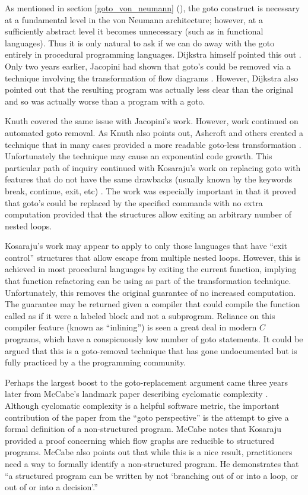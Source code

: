 \documentclass[letterpaper,10pt,twocolumn]{article}
\newcommand{\fullref}[1]{section \ref{#1} (\emph{\nameref{#1}})}
\begin{document}
As mentioned in \fullref{goto_von_neumann}, the goto construct is necessary at a
fundamental level in the von Neumann architecture; however, at a sufficiently
abstract level it becomes unnecessary (such as in functional languages).
Thus it is only natural to ask if we can do away with the goto entirely in
procedural programming languages.  Dijkstra himself pointed this
out \cite{dijkstra}.  Only two years earlier, Jacopini had shown that goto's
could be removed via a technique involving the transformation of flow
diagrams \cite{jacopini}.  However, Dijkstra also pointed out that the resulting
program was actually less clear than the original and so was actually worse
than a program with a goto.

Knuth covered the same issue with Jacopini's work.  However, work continued on
automated goto removal.  As Knuth also points out, Ashcroft and others created
a technique that in many cases provided a more readable goto-less transformation
\cite{ashcroft}. Unfortunately the technique may cause an exponential code growth.
This particular path of inquiry continued with Kosaraju's work on replacing
goto with features that do not have the same drawbacks (usually known by
the keywords break, continue, exit, etc) \cite{kosaraju}.
The work was especially important in that it proved that goto's
could be replaced by the specified commands with no extra computation provided
that the structures allow exiting an arbitrary number of nested loops.

Kosaraju's work may appear to apply to only those languages that have ``exit
control'' structures that allow escape from multiple nested loops.
However, this is achieved in most procedural languages by exiting the
current function, implying that function
refactoring can be using as part of the transformation technique.
Unfortunately, this removes the original guarantee of no increased computation.
The guarantee may be returned given a compiler that could compile the function called
as if it were a labeled block and not a subprogram.  Reliance on this compiler
feature (known as ``inlining'') is seen a great deal in modern $C$ programs,
which have a conspicuously low number of goto statements.  It could be argued
that this is a goto-removal technique that has gone undocumented but is fully
practiced by a the programming community.

Perhaps the largest boost to the goto-replacement argument came three years later
from McCabe's landmark paper describing cyclomatic complexity \cite{mccabe}.
Although cyclomatic complexity is a helpful software metric, the important
contribution of the paper from the ``goto perspective'' is the attempt to give
a formal definition of a non-structured program.  McCabe notes that Kosaraju
\cite{kosaraju} provided a proof concerning which flow graphs are reducible to
structured programs.  McCabe also points out that while this is a nice result,
practitioners need a way to formally identify a non-structured program.
He demonstrates that ``a structured program can be written by not `branching out of
or into a loop, or out of or into a decision'.'' \cite{mccabe}
\end{document}
